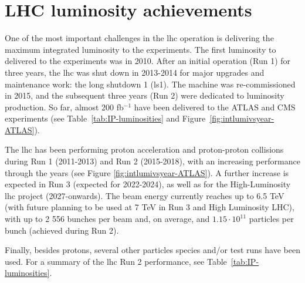 \documentclass[encoding=utf8,british]{tumphthesis}
\begin{document}
\section{LHC luminosity achievements}
\label{sec:lhc-luminosity-acheivements}


One of the most important challenges in the \acrshort{lhc} operation is delivering the maximum integrated luminosity to the experiments. The first luminosity to delivered to the experiments was in 2010. After an initial operation (Run 1) for three years, the \acrshort{lhc} was shut down in 2013-2014 for major upgrades and maintenance work: the long shutdown 1 (\acrshort{ls}1). The machine was re-commissioned in 2015, and the subsequent three years (Run 2) were dedicated to luminosity production. So far, almost 200 fb$^{-1}$ have been delivered to the ATLAS and CMS experiments (see Table~\ref{tab:IP-luminosities} and Figure~\ref{fig:intlumivsyear-ATLAS}).


The \acrshort{lhc} has been performing proton acceleration and proton-proton collisions during Run 1 (2011-2013) and Run 2 (2015-2018), with an increasing performance through the years (see Figure \ref{fig:intlumivsyear-ATLAS}). A further increase is expected in Run 3 (expected for 2022-2024), as well as for the High-Luminosity \acrshort{lhc} project (2027-onwards). The beam energy currently reaches up to 6.5 TeV (with future planning to be used at 7 TeV in Run 3 and High Luminosity LHC), with up to 2 556 bunches per beam and, on average, and $1.15 \cdot 10^{11}$ particles per bunch (achieved during Run 2). 


Finally, besides protons, several other particles species and/or test runs have been used. For a summary of the \acrshort{lhc} Run 2 performance, see Table~\ref{tab:IP-luminosities}.
\end{document}
